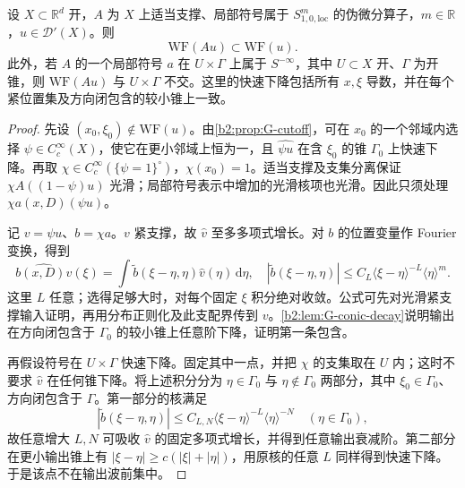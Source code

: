 \begin{proposition}[方向上的伪局部性]\label{b2:prop:G-directional-pseudolocal}
设 \(X\subset\mathbb R^d\) 开，\(A\) 为 \(X\) 上适当支撑、局部符号属于 \(S^m_{1,0,\mathrm{loc}}\) 的伪微分算子，\(m\in\mathbb R\)，\(u\in\mathcal D'(X)\)。则
\[
 \mathrm{WF}(Au)\subset\mathrm{WF}(u).
\]
此外，若 \(A\) 的一个局部符号 \(a\) 在 \(U\times\Gamma\) 上属于 \(S^{-\infty}\)，其中 \(U\subset X\) 开、\(\Gamma\) 为开锥，则 \(\mathrm{WF}(Au)\) 与 \(U\times\Gamma\) 不交。这里的快速下降包括所有 \(x,\xi\) 导数，并在每个紧位置集及方向闭包含的较小锥上一致。
\end{proposition}
\begin{proof}
先设 \((x_0,\xi_0)\notin\mathrm{WF}(u)\)。由\cref{b2:prop:G-cutoff}，可在 \(x_0\) 的一个邻域内选择 \(\psi\in C_c^\infty(X)\)，使它在更小邻域上恒为一，且 \(\widehat{\psi u}\) 在含 \(\xi_0\) 的锥 \(\Gamma_0\) 上快速下降。再取 \(\chi\in C_c^\infty(\{\psi=1\}^{\circ})\)，\(\chi(x_0)=1\)。适当支撑及支集分离保证 \(\chi A((1-\psi)u)\) 光滑；局部符号表示中增加的光滑核项也光滑。因此只须处理 \(\chi a(x,D)(\psi u)\)。

记 \(v=\psi u\)、\(b=\chi a\)。\(v\) 紧支撑，故 \(\widehat v\) 至多多项式增长。对 \(b\) 的位置变量作 Fourier 变换，得到
\[
 \widehat{b(x,D)v}(\xi)
 =\int \widetilde b(\xi-\eta,\eta)\widehat v(\eta)\,\mathrm d\eta,
 \quad
 |\widetilde b(\xi-\eta,\eta)|
 \le C_L\langle\xi-\eta\rangle^{-L}\langle\eta\rangle^m.
\]
这里 \(L\) 任意；选得足够大时，对每个固定 \(\xi\) 积分绝对收敛。公式可先对光滑紧支撑输入证明，再用分布正则化及此支配界传到 \(v\)。\cref{b2:lem:G-conic-decay}说明输出在方向闭包含于 \(\Gamma_0\) 的较小锥上任意阶下降，证明第一条包含。

再假设符号在 \(U\times\Gamma\) 快速下降。固定其中一点，并把 \(\chi\) 的支集取在 \(U\) 内；这时不要求 \(\widehat v\) 在任何锥下降。将上述积分分为 \(\eta\in\Gamma_0\) 与 \(\eta\notin\Gamma_0\) 两部分，其中 \(\xi_0\in\Gamma_0\)、方向闭包含于 \(\Gamma\)。第一部分的核满足
\[
 |\widetilde b(\xi-\eta,\eta)|
 \le C_{L,N}\langle\xi-\eta\rangle^{-L}\langle\eta\rangle^{-N}
 \quad(\eta\in\Gamma_0),
\]
故任意增大 \(L,N\) 可吸收 \(\widehat v\) 的固定多项式增长，并得到任意输出衰减阶。第二部分在更小输出锥上有
\( |\xi-\eta|\ge c(|\xi|+|\eta|)\)，用原核的任意 \(L\) 同样得到快速下降。于是该点不在输出波前集中。
\end{proof}

